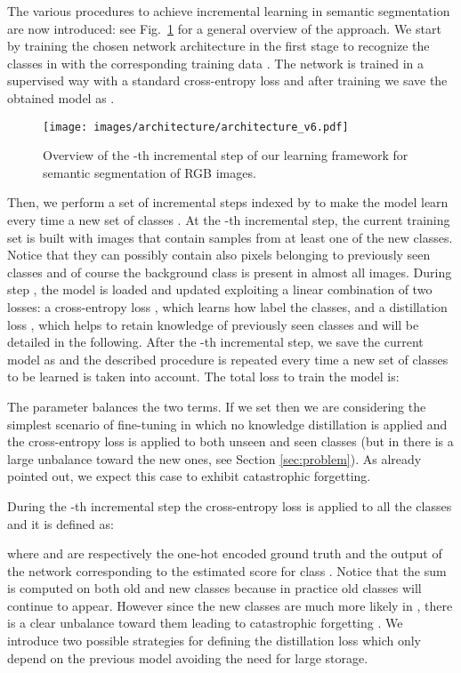 \documentclass[10pt,twocolumn,letterpaper]{article}
\begin{document}
The various procedures to achieve incremental learning in semantic segmentation are now introduced: see  Fig.~\ref{fig:architecture} for a general overview of the approach.
We start by training the chosen network architecture in the first stage to recognize the classes in  with the corresponding training data . The network is trained in a supervised way with a standard cross-entropy loss and after training we save the obtained model as .
\begin{figure}
\centering
\texttt{[image: images/architecture/architecture\_v6.pdf]}
\caption{Overview of the -th incremental step of our learning framework for semantic segmentation of RGB images.}
\label{fig:architecture}
\vspace{-0.35cm}
\end{figure}
Then, we  perform a set of incremental steps indexed by  to make the model learn every time a new set of classes . 
At the -th incremental step, the current training set  is built with images that contain samples from at least one of the new classes. Notice that they can possibly contain also pixels belonging to previously seen classes and of course the background class is present in almost all images. During step , the model  is loaded and updated exploiting  a linear combination of two losses: a cross-entropy loss , which learns how  label the classes, and a distillation loss , which helps to retain knowledge of previously seen classes and will be detailed in the following. After the -th incremental step, we save the current model as  and the described procedure is repeated every time a new set of classes to be learned is taken into account.
The total loss  to train the model is:


The parameter  balances the two terms. If we set  then we are considering the simplest scenario of fine-tuning in which no knowledge distillation is applied and the cross-entropy loss is applied to both unseen and seen classes (but in  there is a large unbalance toward the new ones, see Section \ref{sec:problem}).  
As already pointed out, we expect this case to exhibit  catastrophic forgetting.

During the -th incremental step the cross-entropy loss  is applied to all the classes and it is defined as:


where  and  are respectively the one-hot encoded ground truth and the output of the  network  corresponding to the estimated score for class . Notice that the sum is computed on both old and new classes because in practice old classes will continue to appear. However since the new classes are much more likely in , there is a clear unbalance toward them leading to catastrophic forgetting \cite{wu2019}.
We introduce two possible strategies for defining the distillation loss  which only depend on the previous model  avoiding the need for large storage. 
\end{document}
